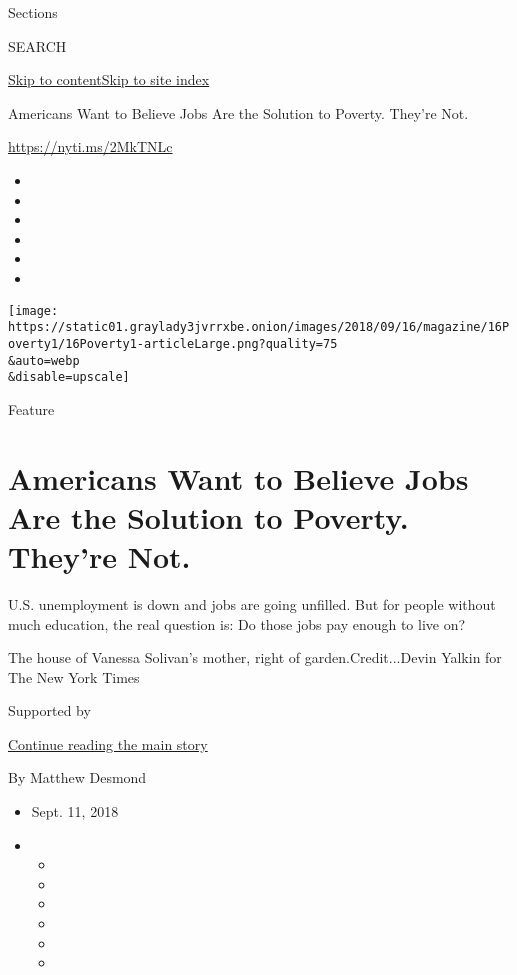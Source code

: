 Sections

SEARCH

\protect\hyperlink{site-content}{Skip to
content}\protect\hyperlink{site-index}{Skip to site index}

Americans Want to Believe Jobs Are the Solution to Poverty. They're Not.

\url{https://nyti.ms/2MkTNLc}

\begin{itemize}
\item
\item
\item
\item
\item
\item
\end{itemize}

\texttt{[image: https://static01.graylady3jvrrxbe.onion/images/2018/09/16/magazine/16Poverty1/16Poverty1-articleLarge.png?quality=75\\\&auto=webp\\\&disable=upscale]}

Feature

\hypertarget{americans-want-to-believe-jobs-are-the-solution-to-poverty-theyre-not}{%
\section{Americans Want to Believe Jobs Are the Solution to Poverty.
They're
Not.}\label{americans-want-to-believe-jobs-are-the-solution-to-poverty-theyre-not}}

U.S. unemployment is down and jobs are going unfilled. But for people
without much education, the real question is: Do those jobs pay enough
to live on?

The house of Vanessa Solivan's mother, right of garden.Credit...Devin
Yalkin for The New York Times

Supported by

\protect\hyperlink{after-sponsor}{Continue reading the main story}

By Matthew Desmond

\begin{itemize}
\item
  Sept. 11, 2018
\item
  \begin{itemize}
  \item
  \item
  \item
  \item
  \item
  \item
  \end{itemize}
\end{itemize}

